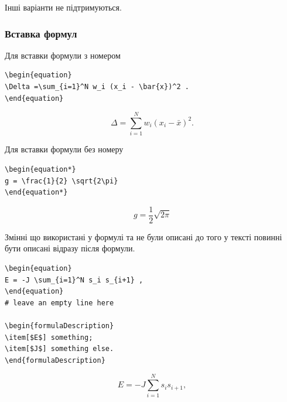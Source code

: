 Інші варіанти не підтримуються.

\subsubsection{Вставка формул}

Для вставки формули з номером

\begin{framed}\small
\begin{lstlisting}
\begin{equation}
\Delta =\sum_{i=1}^N w_i (x_i - \bar{x})^2 .
\end{equation}
\end{lstlisting}
\end{framed}

\begin{equation}
\Delta =\sum_{i=1}^N w_i (x_i - \bar{x})^2 .
\end{equation}

Для вставки формули без номеру

\begin{framed}\small
\begin{lstlisting}
\begin{equation*}
g = \frac{1}{2} \sqrt{2\pi}
\end{equation*}
\end{lstlisting}
\end{framed}

\begin{equation*}
g = \frac{1}{2} \sqrt{2\pi}
\end{equation*}

Змінні що використані у формулі та не були описані до того у тексті повинні бути
описані відразу після формули. 

\begin{framed}\small
\begin{lstlisting}
\begin{equation}
E = -J \sum_{i=1}^N s_i s_{i+1} ,
\end{equation}
# leave an empty line here

\begin{formulaDescription}
\item[$E$] something;
\item[$J$] something else.
\end{formulaDescription}
\end{lstlisting}
\end{framed}

\begin{equation}
E = -J \sum_{i=1}^N s_i s_{i+1} ,
\end{equation}


